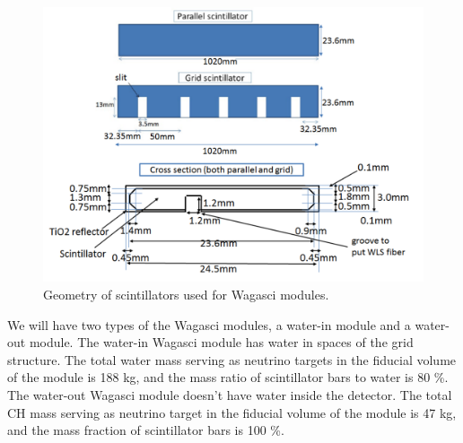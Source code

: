 \begin{figure}[tbh]
\begin{center}
\includegraphics[width=0.8\linewidth]{fig/wagasci_scinti_geometry.pdf}
\end{center}
\caption{
Geometry of scintillators used for Wagasci modules.
}
\label{fig:wagasci_scinti_geometry}
\end{figure}


We will have two types of the Wagasci modules, a water-in module and a water-out module.
The water-in Wagasci module has water in spaces of the grid structure.
The total water mass serving as neutrino targets in the fiducial volume of the module is 188 kg,
and the mass ratio of scintillator bars to water is 80 \%.
The water-out Wagasci module doesn't have water inside the detector.
The total CH mass serving as neutrino target in the fiducial volume of the module is 47 kg,
and the mass fraction of scintillator bars is 100 \%.

